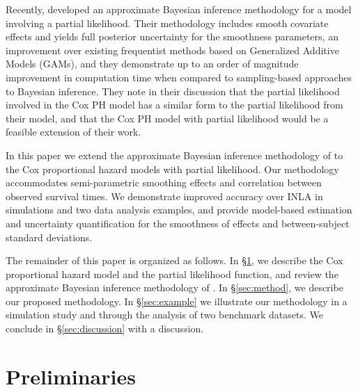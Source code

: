 \documentclass[]{article}
\begin{document}
Recently, \citet{casecross} developed an approximate Bayesian inference methodology for a model involving a partial likelihood. Their methodology includes smooth covariate effects and yields full posterior uncertainty for the smoothness parameters, an improvement over existing frequentist methods based on Generalized Additive Models (GAMs), and they demonstrate up to an order of magnitude improvement in computation time when compared to sampling-based approaches to Bayesian inference. They note in their discussion that the partial likelihood involved in the Cox PH model has a similar form to the partial likelihood from their model, and that the Cox PH model with partial likelihood would be a feasible extension of their work.

In this paper we extend the approximate Bayesian inference methodology of \citet{casecross} to the Cox proportional hazard models with partial likelihood. Our methodology accommodates semi-parametric smoothing effects and correlation between observed survival times. We demonstrate improved accuracy over INLA in simulations and two data analysis examples, and provide model-based estimation and uncertainty quantification for the smoothness of effects and between-subject standard deviations.

The remainder of this paper is organized as follows. In \S\ref{sec:prelim}, we describe the Cox proportional hazard model and the partial likelihood function, and review the approximate Bayesian inference methodology of \citet{casecross}. In \S\ref{sec:method}, we describe our proposed methodology. In \S\ref{sec:example} we illustrate our methodology in a simulation study and through the analysis of two benchmark datasets. We conclude in \S\ref{sec:discussion} with a discussion.



\section{Preliminaries}\label{sec:prelim}
\end{document}

